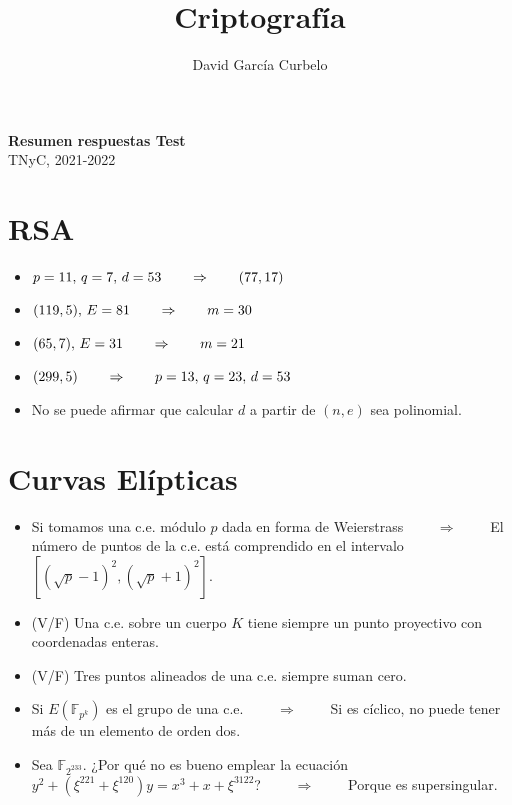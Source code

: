 \documentclass[fleqn]{article}
\author{David García Curbelo}
\title{Criptografía}
\def\F{\mathds{F}}
\def\next{\qquad \Rightarrow \qquad}
\begin{document}
    \begin{center}
        \LARGE{\textbf{Resumen respuestas Test}} \\
        \Large{TNyC, 2021-2022} \\
    \end{center}


    \section{RSA}
    \begin{itemize}
        \item $p = 11, \thinspace q = 7, \thinspace d = 53 \next (77, 17)$
        \item $(119, 5), \thinspace E = 81 \next m = 30$
        \item $(65, 7), \thinspace E = 31 \next m = 21$
        \item $(299, 5) \next p = 13, \thinspace q = 23, \thinspace d = 53$
        \item No se puede afirmar que calcular $d$ a partir de $(n, e)$ sea polinomial.
    \end{itemize}

    \section{Curvas Elípticas}
    \begin{itemize}
        \item Si tomamos una c.e. módulo $p$ dada en forma de Weierstrass $\next$ El número de puntos de la c.e. está comprendido en el intervalo $[(\sqrt{p} - 1)^2, (\sqrt{p} + 1)^2]$.
        \item (V/F) Una c.e. sobre un cuerpo $K$ tiene siempre un punto proyectivo con coordenadas enteras.
        \item (V/F) Tres puntos alineados de una c.e. siempre suman cero.
        \item Si $E(\F_{p^k})$ es el grupo de una c.e. $\next$ Si es cíclico, no puede tener más de un elemento de orden dos.
        \item Sea $\F_{2^{233}}$. ¿Por qué no es bueno emplear la ecuación $y^2 + (\xi^{221} + \xi^{120})y = x^3 + x + \xi^{3122}$? $\next$ Porque es supersingular.
    \end{itemize}
\end{document}
